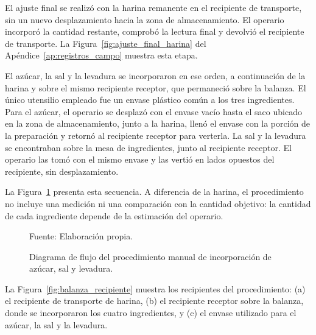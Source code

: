 El ajuste final se realizó con la harina remanente en el recipiente de
transporte, sin un nuevo desplazamiento hacia la zona de almacenamiento.
El operario incorporó la cantidad restante, comprobó la lectura final y
devolvió el recipiente de transporte. La Figura~\ref{fig:ajuste_final_harina}
del Apéndice~\ref{ap:registros_campo} muestra esta etapa.

El azúcar, la sal y la levadura se incorporaron en ese orden, a
continuación de la harina y sobre el mismo recipiente
receptor, que permaneció sobre la balanza. El único utensilio empleado fue
un envase plástico común a los tres ingredientes. Para el azúcar, el operario se desplazó con el
envase vacío hasta el saco ubicado en la zona de almacenamiento, junto a la
harina, llenó el envase con la porción de la preparación y retornó al
recipiente receptor para verterla. La sal y la levadura se encontraban
sobre la mesa de ingredientes, junto al recipiente receptor. El operario
las tomó con el mismo envase y las vertió en lados opuestos del
recipiente, sin desplazamiento.

La Figura~\ref{fig:dfd_azucar_sal_levadura} presenta esta secuencia. A
diferencia de la harina, el procedimiento no incluye una medición ni una
comparación con la cantidad objetivo: la cantidad de cada ingrediente
depende de la estimación del operario.

\begin{figure}[H]
    \centering
    \resizebox{0.36\textwidth}{!}{%
        {\setlength{\fboxsep}{14pt}
        \fbox{}}%
    }
    \caption{Diagrama de flujo del procedimiento manual de incorporación de
    azúcar, sal y levadura.}
    \label{fig:dfd_azucar_sal_levadura}
    \vspace{0.2em}
    {\footnotesize Fuente: Elaboración propia.}
\end{figure}

La Figura~\ref{fig:balanza_recipiente} muestra los recipientes del
procedimiento: (a) el recipiente de transporte de harina, (b) el
recipiente receptor sobre la balanza, donde se incorporaron los cuatro
ingredientes, y (c) el envase utilizado para el azúcar, la sal y la
levadura.

